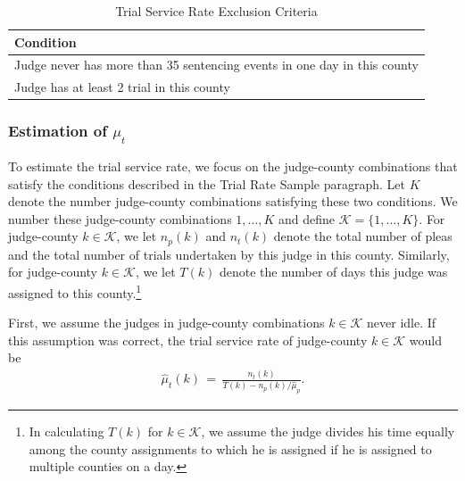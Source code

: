 \documentclass[11pt, oneside]{article}   	%
\theoremstyle{ModifiedStyle}
\begin{document}
				\begin{table}[H]
				\centering
				\caption{Trial Service Rate Exclusion Criteria}
				\begin{tabular}{|l|}
				\hline
				\textbf{Condition}                                                       \\ \hline
				Judge never has more than 35 sentencing events in one day in this county \\
				Judge has at least 2 trial in this county                                \\ \hline
				\end{tabular}
				\end{table}

		\subsubsection{Estimation of $\mu_t$}
			\label{mu_t-estimation}
			To estimate the trial service rate, we focus on the judge-county combinations that satisfy the conditions described in the Trial Rate Sample paragraph. Let $K$ denote the number judge-county combinations satisfying these two conditions. We number these judge-county combinations $1,\ldots,K$ and define $\mathcal{K} = \{1,\ldots,K\}$. For judge-county $k \in \mathcal{K}$, we let $n_p(k)$ and $n_t(k)$ denote the total number of pleas and the total number of trials undertaken by this judge in this county. Similarly, for judge-county $k \in \mathcal{K}$, we let $T(k)$ denote the number of days this judge was assigned to this county.\footnote{In calculating $T(k)$ for $k\in\mathcal{K}$, we assume the judge divides his time equally among the county assignments to which he is assigned if he is assigned to multiple counties on a day.}

			First, we assume the judges in judge-county combinations $k\in\mathcal{K}$ never idle. If this assumption was correct, the trial service rate of judge-county $k\in\mathcal{K}$ would be
			\begin{align*}
				\hat{\mu}_t(k) \,=\, \frac{n_t(k)}{T(k) - n_p(k) / \hat{\mu}_p}.
			\end{align*}
\end{document}
